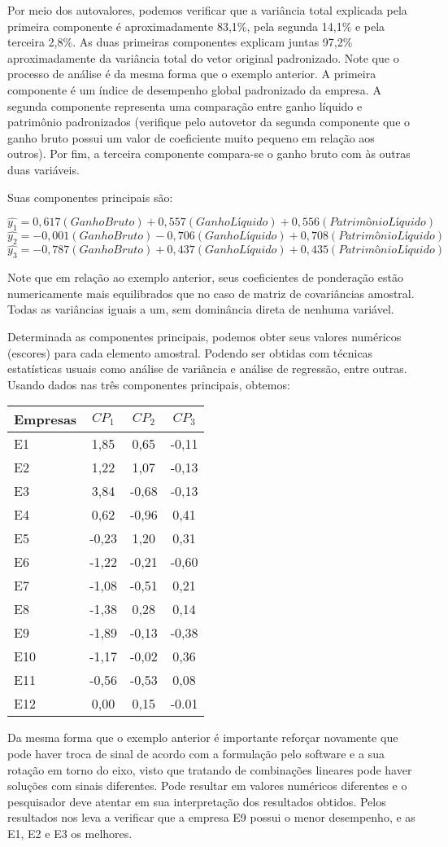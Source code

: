 \documentclass[
]{book}
\begin{document}
Por meio dos autovalores, podemos verificar que a variância total explicada pela primeira componente é aproximadamente 83,1\%, pela segunda 14,1\% e pela terceira 2,8\%. As duas primeiras componentes explicam juntas 97,2\% aproximadamente da variância total do vetor original padronizado. Note que o processo de análise é da mesma forma que o exemplo anterior. A primeira componente é um índice de desempenho global padronizado da empresa. A segunda componente representa uma comparação entre ganho líquido e patrimônio padronizados (verifique pelo autovetor da segunda componente que o ganho bruto possui um valor de coeficiente muito pequeno em relação aos outros). Por fim, a terceira componente compara-se o ganho bruto com às outras duas variáveis.

Suas componentes principais são:

\[\hat{y_1}=0,617(Ganho Bruto)+0,557(GanhoLíquido)+0,556(PatrimônioLíquido)\]
\[\hat{y_2}=-0,001(Ganho Bruto)-0,706(GanhoLíquido)+0,708(PatrimônioLíquido)\]
\[\hat{y_3}=-0,787(Ganho Bruto)+0,437(GanhoLíquido)+0,435(PatrimônioLíquido)\]

Note que em relação ao exemplo anterior, seus coeficientes de ponderação estão numericamente mais equilibrados que no caso de matriz de covariâncias amostral. Todas as variâncias iguais a um, sem dominância direta de nenhuma variável.

Determinada as componentes principais, podemos obter seus valores numéricos (escores) para cada elemento amostral. Podendo ser obtidas com técnicas estatísticas usuais como análise de variância e análise de regressão, entre outras. Usando dados nas três componentes principais, obtemos:

\begin{longtable}[]{@{}lccc@{}}
\toprule
\textbf{Empresas} & \textbf{\(CP_1\)} & \textbf{\(CP_2\)} & \textbf{\(CP_3\)}\tabularnewline
\midrule
\endhead
E1 & 1,85 & 0,65 & -0,11\tabularnewline
E2 & 1,22 & 1,07 & -0,13\tabularnewline
E3 & 3,84 & -0,68 & -0,13\tabularnewline
E4 & 0,62 & -0,96 & 0,41\tabularnewline
E5 & -0,23 & 1,20 & 0,31\tabularnewline
E6 & -1,22 & -0,21 & -0,60\tabularnewline
E7 & -1,08 & -0,51 & 0,21\tabularnewline
E8 & -1,38 & 0,28 & 0,14\tabularnewline
E9 & -1,89 & -0,13 & -0,38\tabularnewline
E10 & -1,17 & -0,02 & 0,36\tabularnewline
E11 & -0,56 & -0,53 & 0,08\tabularnewline
E12 & 0,00 & 0,15 & -0.01\tabularnewline
\bottomrule
\end{longtable}

Da mesma forma que o exemplo anterior é importante reforçar novamente que pode haver troca de sinal de acordo com a formulação pelo software e a sua rotação em torno do eixo, visto que tratando de combinações lineares pode haver soluções com sinais diferentes. Pode resultar em valores numéricos diferentes e o pesquisador deve atentar em sua interpretação dos resultados obtidos. Pelos resultados nos leva a verificar que a empresa E9 possui o menor desempenho, e as E1, E2 e E3 os melhores.
\end{document}
